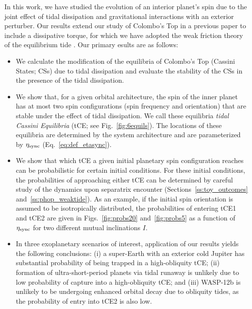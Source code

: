 \documentclass[
        fleqn,
        usenatbib,
    ]{mnras}
\begin{document}
In this work, we have studied the evolution of an interior planet's spin due to
the joint effect of tidal dissipation and gravitational interactions with an
exterior perturber. Our results extend our study of Colombo's Top in a previous
paper \citep{su2020} to include a dissipative torque, for which we have adopted
the weak friction theory of the equilibrium tide \citep{lai2012}. Our primary
esults are as follows:
\begin{itemize}
    \item We calculate the modification of the equilibria of Colombo's Top
        (Cassini States; CSs) due to tidal dissipation and evaluate the
        stability of the CSs in the presence of the tidal dissipation.

    \item We show that, for a given orbital architecture, the spin of the inner
        planet has at most two spin configurations (spin frequency and
        orientation) that are stable under the effect of tidal dissipation. We
        call these equilibria \emph{tidal Cassini Equilibria} (tCE\@; see
        Fig.~\ref{fig:6equils}). The locations of these equilibria are
        determined by the system architecture and are parameterized by
        $\eta_{\rm sync}$ (Eq.~\ref{eq:def_etasync}).

    \item We show that which tCE a given initial planetary spin configuration
        reaches can be probabilistic for certain initial conditions. For these
        initial conditions, the probabilities of approaching either tCE can be
        determined by careful study of the dynamics upon separatrix encounter
        (Sections~\ref{ss:toy_outcomes} and~\ref{ss:phop_weaktide}). As an
        example, if the initial spin orientation is assumed to be isotropically
        distributed, the probabilities of entering tCE1 and tCE2 are given in
        Figs.~\ref{fig:probs20} and~\ref{fig:probs5} as a function of $\eta_{\rm
        sync}$ for two different mutual inclinations $I$.

    \item In three exoplanetary scenarios of interest, application of our
        results yields the following conclusions: (i) a super-Earth with an
        exterior cold Jupiter has substantial probability of being trapped in a
        high-obliquity tCE\@; (ii) formation of ultra-short-period planets via
        tidal runaway is unlikely due to low probability of capture into a
        high-obliquity tCE\@; and (iii) WASP-12b is unlikely to be undergoing
        enhanced orbital decay due to obliquity tides, as the probability of
        entry into tCE2 is also low.
\end{itemize}
\end{document}
